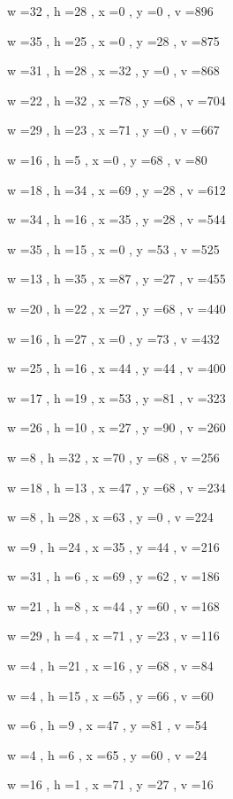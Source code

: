 \documentclass[11pt]{article}
\begin{document}
w =32 , h =28 , x =0 , y =0 , v =896
\par
w =35 , h =25 , x =0 , y =28 , v =875
\par
w =31 , h =28 , x =32 , y =0 , v =868
\par
w =22 , h =32 , x =78 , y =68 , v =704
\par
w =29 , h =23 , x =71 , y =0 , v =667
\par
w =16 , h =5 , x =0 , y =68 , v =80
\par
w =18 , h =34 , x =69 , y =28 , v =612
\par
w =34 , h =16 , x =35 , y =28 , v =544
\par
w =35 , h =15 , x =0 , y =53 , v =525
\par
w =13 , h =35 , x =87 , y =27 , v =455
\par
w =20 , h =22 , x =27 , y =68 , v =440
\par
w =16 , h =27 , x =0 , y =73 , v =432
\par
w =25 , h =16 , x =44 , y =44 , v =400
\par
w =17 , h =19 , x =53 , y =81 , v =323
\par
w =26 , h =10 , x =27 , y =90 , v =260
\par
w =8 , h =32 , x =70 , y =68 , v =256
\par
w =18 , h =13 , x =47 , y =68 , v =234
\par
w =8 , h =28 , x =63 , y =0 , v =224
\par
w =9 , h =24 , x =35 , y =44 , v =216
\par
w =31 , h =6 , x =69 , y =62 , v =186
\par
w =21 , h =8 , x =44 , y =60 , v =168
\par
w =29 , h =4 , x =71 , y =23 , v =116
\par
w =4 , h =21 , x =16 , y =68 , v =84
\par
w =4 , h =15 , x =65 , y =66 , v =60
\par
w =6 , h =9 , x =47 , y =81 , v =54
\par
w =4 , h =6 , x =65 , y =60 , v =24
\par
w =16 , h =1 , x =71 , y =27 , v =16
\par
\newpage
\end{document}
